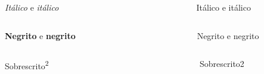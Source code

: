 \documentclass[
]{book}
\begin{document}
\begin{columns}

\begin{column}

\emph{Itálico} e \emph{itálico}

\end{column}

\begin{column}

~

\end{column}

\begin{column}

Itálico e itálico

\end{column}

\end{columns}

\begin{columns}

\begin{column}

\textbf{Negrito} e \textbf{negrito}

\end{column}

\begin{column}

~

\end{column}

\begin{column}

Negrito e negrito

\end{column}

\end{columns}

\begin{columns}

\begin{column}

Sobrescrito\textsuperscript{2}

\end{column}

\begin{column}

~

\end{column}

\begin{column}

Sobrescrito2

\end{column}

\end{columns}
\end{document}

